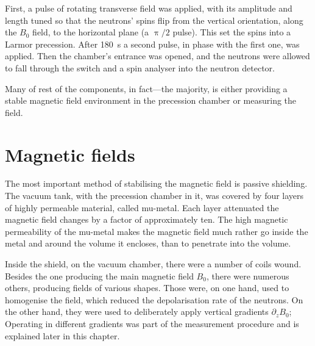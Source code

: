 First, a pulse of rotating  transverse field was applied, with its amplitude and length tuned so that the neutrons' spins flip from the vertical orientation, along the $B_0$ field, to the horizontal plane (a $\uppi/2$ pulse).
This set the spins into a Larmor precession.
After \SI{180}{\second} a second pulse, in phase with the first one, was applied. Then the chamber's entrance was opened, and the neutrons were allowed to fall through the switch and a spin analyser into the neutron detector.


Many of rest of the components, in fact---the majority, is either providing a stable magnetic field environment in the precession chamber or measuring the field.




\section{Magnetic fields}
The most important method of stabilising the magnetic field is passive shielding. The vacuum tank, with the precession chamber in it, was covered by four layers of highly permeable material, called mu-metal.
Each layer attenuated the magnetic field changes by a factor of approximately ten. The high magnetic permeability of the mu-metal makes the magnetic field much rather go inside the metal and around the volume it encloses, than to penetrate into the volume. 

Inside the shield, on the vacuum chamber, there were a number of coils wound. 
Besides the one producing the main magnetic field $B_0$, there were numerous others, producing fields of various shapes.
Those were, on one hand, used to homogenise the field, which reduced the depolarisation rate of the neutrons. On the other hand, they were used to deliberately apply vertical gradients $\partial_z B_0$; Operating in different gradients was part of the measurement procedure and is explained later in this chapter.

